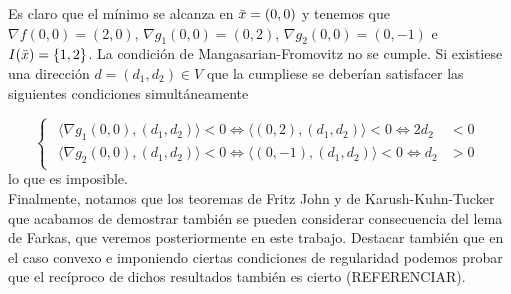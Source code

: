 Es claro que el mínimo se alcanza en $ \bar{x} = (0,0) $ y tenemos que $ \nabla f(0,0) = (2,0) $, $ \nabla g_1(0,0) = (0,2) $, $ \nabla g_2(0,0) = (0,-1) $ e $ I(\bar{x}) = \{1,2\} $. La condición de Mangasarian-Fromovitz no se cumple. Si existiese una dirección $ d = (d_1, d_2) \in V $ que la cumpliese se deberían satisfacer las siguientes condiciones simultáneamente

\begin{equation*}
\begin{cases}
\begin{split}
\langle \nabla g_1(0,0),(d_1, d_2) \rangle < 0 \Longleftrightarrow  \langle (0,2),(d_1, d_2) \rangle < 0 \Longleftrightarrow 2d_2 &< 0\\
\langle \nabla g_2(0,0),(d_1, d_2) \rangle < 0 \Longleftrightarrow \langle (0,-1),(d_1, d_2) \rangle < 0 \Longleftrightarrow d_2 &> 0
\end{split}
\end{cases} 
\end{equation*}
lo que es imposible. \\

Finalmente, notamos que los teoremas de Fritz John y de Karush-Kuhn-Tucker que acabamos de demostrar también se pueden considerar consecuencia del lema de Farkas, que veremos posteriormente en este trabajo. Destacar también que en el caso convexo e imponiendo ciertas condiciones de regularidad podemos probar que el recíproco de dichos resultados también es cierto (REFERENCIAR).